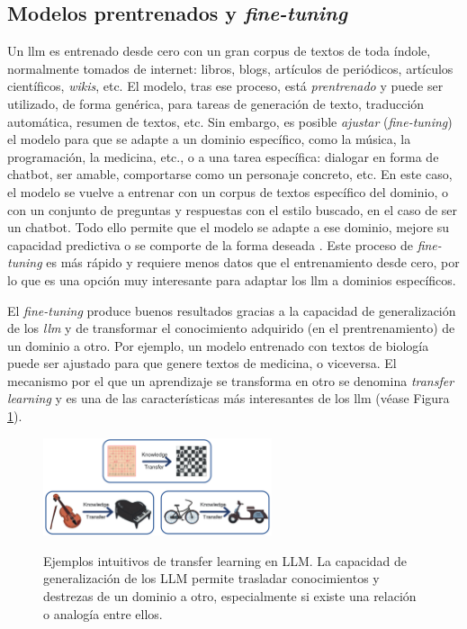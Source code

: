 \subsection{Modelos prentrenados y \emph{fine-tuning}} 
Un \gls{llm} es entrenado desde cero con un gran corpus de textos de toda índole, normalmente tomados de internet: libros, blogs, artículos de periódicos, artículos científicos, \emph{wikis}, etc. El modelo, tras ese proceso, está \emph{prentrenado} \citep{hanPreTrainedModelsPresent2021} y puede ser utilizado, de forma genérica, para tareas de generación de texto, traducción automática, resumen de textos, etc. Sin embargo, es posible \emph{ajustar} (\emph\emph{fine-tuning}) el modelo para que se adapte a un dominio específico, como la música, la programación, la medicina, etc., o a una tarea específica: dialogar en forma de {chatbot}, ser amable, comportarse como un personaje concreto, etc. En este caso, el modelo se vuelve a entrenar con un corpus de textos específico del dominio, o con un conjunto de preguntas y respuestas con el estilo buscado, en el caso de ser un {chatbot}. Todo ello permite que el modelo se adapte a ese dominio, mejore su capacidad predictiva o se comporte de la forma deseada \citep{tianFinetuningLanguageModels2023}. Este proceso de \emph{fine-tuning} es más rápido y requiere menos datos que el entrenamiento desde cero, por lo que es una opción muy interesante para adaptar los \gls{llm} a dominios específicos.

El \emph{fine-tuning} produce buenos resultados gracias a la capacidad de generalización de los \emph{llm} y de transformar el conocimiento adquirido (en el prentrenamiento) de un dominio a otro. Por ejemplo, un modelo entrenado con textos de biología puede ser {ajustado} para que genere textos de medicina, o viceversa. El mecanismo por el que un aprendizaje se transforma en otro se denomina \emph{transfer learning} \citep{zhuangComprehensiveSurveyTransfer2020} y es una de las características más interesantes de los \gls{llm} (véase Figura \ref{fig:transfer_learning}).

\begin{figure}[H]
    \caption[Ejemplos intuitivos de {transfer learning} en LLM]{Ejemplos intuitivos de {transfer learning} en LLM. La capacidad de generalización de los LLM permite trasladar conocimientos y destrezas de un dominio a otro, especialmente si existe una relación o analogía entre ellos.}
    \centering
    \includegraphics[width=0.6\textwidth]{./figuras/transfer_learning.png}
    \label{fig:transfer_learning}
\end{figure}


